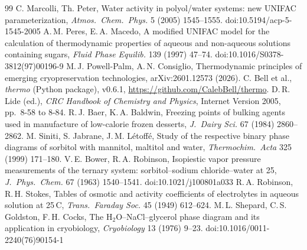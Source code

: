\documentclass[10pt,a4paper]{article}
\begin{document}
\begin{thebibliography}{99}
 C. Marcolli, Th. Peter, Water activity in polyol/water systems: new UNIFAC parameterization, \emph{Atmos.\ Chem.\ Phys.} 5 (2005) 1545--1555. doi:10.5194/acp-5-1545-2005
 A.\,M. Peres, E.\,A. Macedo, A modified UNIFAC model for the calculation of thermodynamic properties of aqueous and non-aqueous solutions containing sugars, \emph{Fluid Phase Equilib.} 139 (1997) 47--74. doi:10.1016/S0378-3812(97)00196-9
 M.\,J. Powell-Palm, A.\,N. Consiglio, Thermodynamic principles of emerging cryopreservation technologies, arXiv:2601.12573 (2026).
 C. Bell et al., \emph{thermo} (Python package), v0.6.1, \url{https://github.com/CalebBell/thermo}.
 D.\,R. Lide (ed.), \emph{CRC Handbook of Chemistry and Physics}, Internet Version 2005, pp.\ 8-58 to 8-84.
 R.\,J. Baer, K.\,A. Baldwin, Freezing points of bulking agents used in manufacture of low-calorie frozen desserts, \emph{J.\ Dairy Sci.} 67 (1984) 2860--2862.
 M. Siniti, S. Jabrane, J.\,M. L\'etoff\'e, Study of the respective binary phase diagrams of sorbitol with mannitol, maltitol and water, \emph{Thermochim.\ Acta} 325 (1999) 171--180.
 V.\,E. Bower, R.\,A. Robinson, Isopiestic vapor pressure measurements of the ternary system: sorbitol--sodium chloride--water at 25\textdegree, \emph{J.\ Phys.\ Chem.} 67 (1963) 1540--1541. doi:10.1021/j100801a033
 R.\,A. Robinson, R.\,H. Stokes, Tables of osmotic and activity coefficients of electrolytes in aqueous solution at 25\,\textdegree C, \emph{Trans.\ Faraday Soc.} 45 (1949) 612--624.
 M.\,L. Shepard, C.\,S. Goldston, F.\,H. Cocks, The H$_2$O--NaCl--glycerol phase diagram and its application in cryobiology, \emph{Cryobiology} 13 (1976) 9--23. doi:10.1016/0011-2240(76)90154-1
\end{thebibliography}
\end{document}
